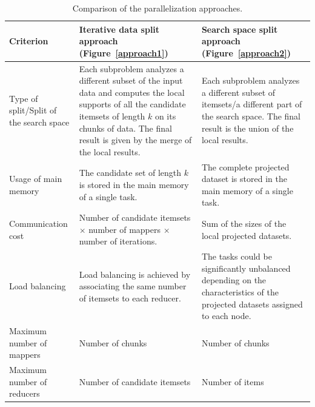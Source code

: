 \begin{table}[]
\scriptsize
\centering
\caption{Comparison of the parallelization approaches.}\label{tab:assumptions}
\begin{tabular}{|p{2.5cm}|p{5cm}|p{5cm}|}

\hline {\bf Criterion} & {\bf Iterative data split approach (Figure~\ref{approach1})} & {\bf Search space split approach (Figure~\ref{approach2})} \\
\hline
\hline Type of split/Split of the search space &  Each subproblem analyzes a different subset of the input data and computes the local supports of 
all the candidate itemsets of length $k$ on its chunks of data. The final result is given by the merge of the local results.  &  Each subproblem analyzes a different subset of itemsets/a different part of the search space. The final result is the union of the local results. \\
\hline Usage of main memory &  The candidate set of length $k$ is stored in the main memory of a single task. & The complete projected dataset is stored in the main memory of a single task. \\
\hline Communication cost &  Number of candidate itemsets $\times$ number of mappers $\times$ number of iterations. & Sum of the sizes of the local projected datasets. \\
\hline Load balancing &  Load balancing is achieved by associating the same number of itemsets to each reducer. & The tasks could be significantly unbalanced depending on the characteristics of the projected datasets assigned to each node.\\
\hline Maximum number of mappers & Number of chunks  & Number of chunks  \\
\hline Maximum number of reducers & Number of candidate itemsets  & Number of items \\
\hline
\end{tabular}
\end{table}

